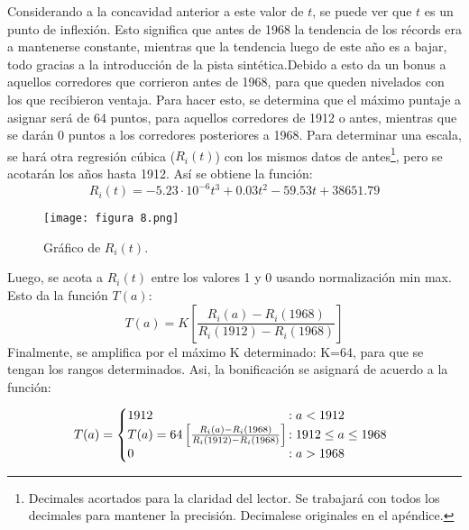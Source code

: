 \documentclass[a4paper]{article}
\begin{document}
Considerando a la concavidad anterior a este valor de $t$, se puede ver que $t$ es un punto de inflexión. Esto significa que antes de 1968 la tendencia de los récords era a mantenerse constante, mientras que la tendencia luego de este año es a bajar, todo gracias a la introducción de la pista sintética.\newline\newline  Debido a esto da un bonus a aquellos corredores que corrieron antes de 1968, para que queden nivelados con los que recibieron ventaja. Para hacer esto, se determina que el máximo puntaje a asignar será de 64 puntos, para aquellos corredores de 1912 o antes, mientras que se darán 0 puntos a los corredores posteriores a 1968. Para determinar una escala, se hará otra regresión cúbica ($R_{i}(t)$) con los mismos datos de antes\footnote{Decimales acortados para la claridad del lector. Se trabajará con todos los decimales para mantener la precisión. Decimalese originales en el apéndice.}, pero se acotarán los años hasta 1912. Así se obtiene la función: \begin{equation*}
    R_{i}(t)=-5.23\cdot 10^{-6}t^{3}+0.03t^{2}-59.53t+38651.79
\end{equation*}
\begin{figure}[H]
    \begin{center}
    \texttt{[image: figura 8.png]}    
    \end{center}    
    \caption{Gráfico de $R_{i}(t)$.}
\end{figure}
Luego, se acota a $R_{i}(t)$ entre los valores 1 y 0 usando normalización min max. Esto da la función $T(a)$:
\begin{equation*}
    T(a)= K \left[\frac{R_{i}(a)-R_{i}(1968)}{R_{i}(1912)-R_{i}(1968)}\right]
\end{equation*}
Finalmente, se amplifica por el máximo K determinado: K=64, para que se tengan los rangos determinados. Asi, la bonificación se asignará de acuerdo a la función: 

\[
  T(a) = \left\{
     \begin{array}{@{}l@{\thinspace}l}
       1912 &: a<1912\\
       T(a)=64\left[\frac{R_{i}(a)-R_{i}(1968)}{R_{i}(1912)-R_{i}(1968)}\right]  &: 1912\leq a\leq 1968\\
       0&: a>1968 \\
     \end{array}
   \right.
\]
\end{document}
